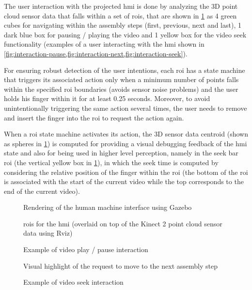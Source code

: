 The user interaction with the projected \gls{hmi} is done by analyzing the 3D point cloud sensor data that falls within a set of \glspl{roi}, that are shown in \cref{fig:interaction-rois} as 4 green cubes for navigating within the assembly steps (first, previous, next and last), 1 dark blue box for pausing / playing the video and 1 yellow box for the video seek functionality (examples of a user interacting with the \gls{hmi} shown in \cref{fig:interaction-pause,fig:interaction-next,fig:interaction-seek}).

For ensuring robust detection of the user intentions, each \gls{roi} has a state machine that triggers its associated action only when a minimum number of points falls within the specified \gls{roi} boundaries (avoids sensor noise problems) and the user holds his finger within it for at least 0.25 seconds. Moreover, to avoid unintentionally triggering the same action several times, the user needs to remove and insert the finger into the \gls{roi} to request the action again.

When a \gls{roi} state machine activates its action, the 3D sensor data centroid (shown as spheres in \cref{fig:interaction-rois}) is computed for providing a visual debugging feedback of the \gls{hmi} state and also for being used in higher level perception, namely in the seek bar \gls{roi} (the vertical yellow box in \cref{fig:interaction-rois}), in which the seek time is computed by considering the relative position of the finger within the \gls{roi} (the bottom of the \gls{roi} is associated with the start of the current video while the top corresponds to the end of the current video).

\begin{figure}[H]
	\begin{floatrow}[2]
		{\caption{Rendering of the human machine interface using Gazebo}\label{fig:human-machine-interface}}
		{\caption{\glspl{roi} for the \gls{hmi} (overlaid on top of the Kinect 2 point cloud sensor data using Rviz)}\label{fig:interaction-rois}}
	\end{floatrow}
\end{figure}

\begin{figure}[ht]
	\begin{floatrow}[3]
		{\caption{Example of video play / pause interaction}\label{fig:interaction-pause}}
		{\caption{Visual highlight of the request to move to the next assembly step}\label{fig:interaction-next}}
		{\caption{Example of video seek interaction}\label{fig:interaction-seek}}
	\end{floatrow}
\end{figure}


